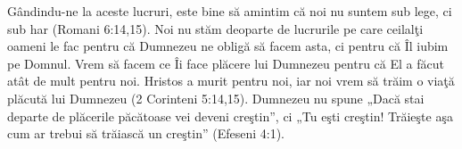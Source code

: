 Gândindu-ne la aceste lucruri, este bine să amintim că noi nu suntem sub lege, ci sub har (Romani 6:14,15). Noi nu stăm deoparte de lucrurile pe care ceilalţi oameni le fac pentru că Dumnezeu ne obligă să facem asta, ci pentru că Îl iubim pe Domnul. Vrem să facem ce Îi face plăcere lui Dumnezeu pentru că El a făcut atât de mult pentru noi. Hristos a murit pentru noi, iar noi vrem să trăim o viaţă plăcută lui Dumnezeu (2 Corinteni 5:14,15). Dumnezeu nu spune „Dacă stai departe de plăcerile păcătoase vei deveni creştin”, ci „Tu eşti creştin! Trăieşte aşa cum ar trebui să trăiască un creştin” (Efeseni 4:1).